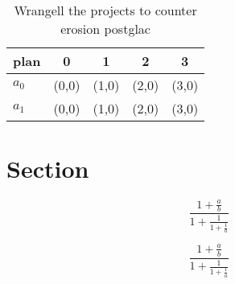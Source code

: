 \documentclass[a4paper]{article}
\begin{document}
\begin{table}
\begin{adjustbox}{width=0.8\columnwidth}
\begin{tabular}{|l|l|l|l|l|}
\hline
\textbf{plan} & \multicolumn{1}{c|}{\textbf{0}} & \multicolumn{1}{c|}{\textbf{1}} & \multicolumn{1}{c|}{\textbf{2}} & \multicolumn{1}{c|}{\textbf{3}} \\ \hline
\textbf{$a_0$}  & (0,0) & (1,0) & (2,0) & (3,0) \\ \hline
\textbf{$a_1$}  & (0,0) & (1,0) & (2,0) & (3,0) \\ \hline
\end{tabular}
\end{adjustbox}
\caption{Wrangell the projects to counter erosion postglac
}
\end{table}

\section{Section}

\[ \frac{1+\frac{a}{b}}{1+\frac{1}{1+\frac{1}{a}}} \]

\[ \frac{1+\frac{a}{b}}{1+\frac{1}{1+\frac{1}{a}}} \]
\end{document}
